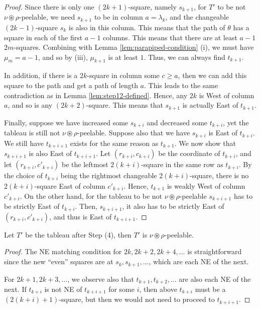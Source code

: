 \documentclass[ALCO,Unicode]{cedram}
\begin{document}
    \begin{proof}
        Since there is only one $(2k+1)$-square, namely $s_{k+1}$, for $T'$ to be not $\nu\circledast\rho$-peelable, we need $s_{k+1}$ to be in column $a = \lambda_k$, and the changeable $(2k-1)$-square $s_k$ is also in this column. This means that the path of $\theta$ has a square in each of the first $a-1$ columns. This means that there are at least $a-1$ $2m$-squares. Combining with Lemma \ref{lem:parapiped-condition} (i), we must have $\mu_m = a-1$, and so by (iii), $\mu_{k+1}$ is at least $1$. Thus, we can always find $t_{k+1}$.
        
        In addition, if there is a $2k$-square in column some $c\geq a$, then we can add this square to the path and get a path of length $a$. This leads to the same contradiction as in Lemma \ref{lem:step12-defined}. Hence, any $2k$ is West of column $a$, and so is any $(2k+2)$-square. This means that $s_{k+1}$ is actually East of $t_{k+1}$.

        Finally, suppose we have increased some $s_{k+i}$ and decreased some $t_{k+i}$, yet the tableau is still not $\nu\circledast\rho$-peelable. Suppose also that we have $s_{k+i}$ is East of $t_{k+i}$. We still have $t_{k+i+1}$ exists for the same reason as $t_{k+1}$. We now show that $s_{k+i+1}$ is also East of $t_{k+i+1}$. Let $(r_{k+i},c_{k+i})$ be the coordinate of $t_{k+i}$, and let $(r_{k+i},c'_{k+i})$ be the leftmost $2(k+i)$-square in the same row as $t_{k+i}$. By the choice of $t_{k+i}$ being the rightmost changeable $2(k+i)$-square, there is no $2(k+i)$-square East of column $c'_{k+i}$. Hence, $t_{k+1}$ is weakly West of column $c'_{k+i}$. On the other hand, for the tableau to be not $\nu\circledast\rho$-peelable $s_{k+i+1}$ has to be strictly East of $t_{k+i}$. Then, $s_{k+i+1}$, it also has to be strictly East of $(r_{k+i},c'_{k+i})$, and thus is East of $t_{k+i+1}$.
    \end{proof}

    \begin{lemma}\label{lem:step34-good}
        Let $T'$ be the tableau after Step (4), then $T'$ is $\nu\circledast\rho$-peelable.
    \end{lemma}

    \begin{proof}
        The NE matching condition for $2k,2k+2,2k+4,\ldots$ is straightforward since the new ``even'' squares are at $s_{k},s_{k+1},\ldots$, which are each NE of the next.

        For $2k+1,2k+3,\ldots$, we observe also that $t_{k+1},t_{k+2},\ldots$ are also each NE of the next. If $t_{k+i}$ is not NE of $t_{k+i+1}$ for some $i$, then above $t_{k+i}$ must be a $(2(k+i)+1)$-square, but then we would not need to proceed to $t_{k+i+1}$.
    \end{proof}
\end{document}
